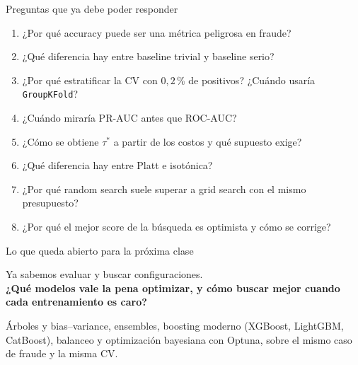 \documentclass[aspectratio=169,12pt]{beamer}
\begin{document}
\begin{frame}{Preguntas que ya debe poder responder}
  \small
  \begin{enumerate}
    \item ¿Por qué accuracy puede ser una métrica peligrosa en fraude?
    \item ¿Qué diferencia hay entre baseline trivial y baseline serio?
    \item ¿Por qué estratificar la CV con $0{,}2$\,\% de positivos? ¿Cuándo usaría \texttt{GroupKFold}?
    \item ¿Cuándo miraría PR-AUC antes que ROC-AUC?
    \item ¿Cómo se obtiene $\tau^*$ a partir de los costos y qué supuesto exige?
    \item ¿Qué diferencia hay entre Platt e isotónica?
    \item ¿Por qué random search suele superar a grid search con el mismo presupuesto?
    \item ¿Por qué el mejor score de la búsqueda es optimista y cómo se corrige?
  \end{enumerate}
\end{frame}

\begin{frame}{Lo que queda abierto para la próxima clase}
  \begin{center}
    \large Ya sabemos evaluar y buscar configuraciones.\\[6pt]
    \textbf{¿Qué modelos vale la pena optimizar, y cómo buscar mejor cuando cada entrenamiento es caro?}
  \end{center}
  \vspace{6pt}
  \begin{keybox}[Parte 2]
    Árboles y bias--variance, ensembles, boosting moderno (XGBoost, LightGBM, CatBoost), balanceo y optimización bayesiana con Optuna, sobre el mismo caso de fraude y la misma CV.
  \end{keybox}
\end{frame}
\end{document}
